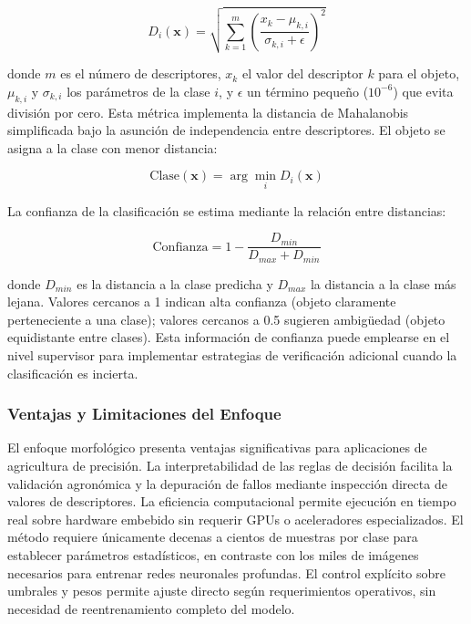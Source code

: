 \begin{equation}
D_i(\mathbf{x}) = \sqrt{\sum_{k=1}^{m} \left(\frac{x_k - \mu_{k,i}}{\sigma_{k,i} + \epsilon}\right)^2}
\end{equation}

donde $m$ es el número de descriptores, $x_k$ el valor del descriptor $k$ para el objeto, $\mu_{k,i}$ y $\sigma_{k,i}$ los parámetros de la clase $i$, y $\epsilon$ un término pequeño ($10^{-6}$) que evita división por cero. Esta métrica implementa la distancia de Mahalanobis simplificada bajo la asunción de independencia entre descriptores. El objeto se asigna a la clase con menor distancia:

\begin{equation}
\text{Clase}(\mathbf{x}) = \arg\min_{i} D_i(\mathbf{x})
\end{equation}

La confianza de la clasificación se estima mediante la relación entre distancias:

\begin{equation}
\text{Confianza} = 1 - \frac{D_{min}}{D_{max} + D_{min}}
\end{equation}

donde $D_{min}$ es la distancia a la clase predicha y $D_{max}$ la distancia a la clase más lejana. Valores cercanos a 1 indican alta confianza (objeto claramente perteneciente a una clase); valores cercanos a 0.5 sugieren ambigüedad (objeto equidistante entre clases). Esta información de confianza puede emplearse en el nivel supervisor para implementar estrategias de verificación adicional cuando la clasificación es incierta.

\subsubsection{Ventajas y Limitaciones del Enfoque}

El enfoque morfológico presenta ventajas significativas para aplicaciones de agricultura de precisión. La interpretabilidad de las reglas de decisión facilita la validación agronómica y la depuración de fallos mediante inspección directa de valores de descriptores. La eficiencia computacional permite ejecución en tiempo real sobre hardware embebido sin requerir GPUs o aceleradores especializados. El método requiere únicamente decenas a cientos de muestras por clase para establecer parámetros estadísticos, en contraste con los miles de imágenes necesarios para entrenar redes neuronales profundas. El control explícito sobre umbrales y pesos permite ajuste directo según requerimientos operativos, sin necesidad de reentrenamiento completo del modelo.

